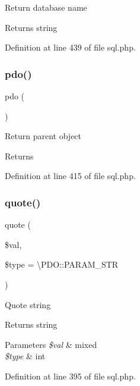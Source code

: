 Return database name \begin{DoxyReturn}{Returns}
string 
\end{DoxyReturn}


Definition at line 439 of file sql.\+php.

\hypertarget{class_d_b_1_1_s_q_l_aa7612909f2506ecd3f2bc4ecbef3fe31}{}\label{class_d_b_1_1_s_q_l_aa7612909f2506ecd3f2bc4ecbef3fe31} 
\subsubsection{\texorpdfstring{pdo()}{pdo()}}
{\footnotesize\ttfamily pdo (\begin{DoxyParamCaption}{ }\end{DoxyParamCaption})}

Return parent object \begin{DoxyReturn}{Returns}

\end{DoxyReturn}


Definition at line 415 of file sql.\+php.

\hypertarget{class_d_b_1_1_s_q_l_a719a37ee06136f9b4a4214632466bfb1}{}\label{class_d_b_1_1_s_q_l_a719a37ee06136f9b4a4214632466bfb1} 
\subsubsection{\texorpdfstring{quote()}{quote()}}
{\footnotesize\ttfamily quote (\begin{DoxyParamCaption}\item[{}]{\$val,  }\item[{}]{\$type = {\ttfamily \textbackslash{}PDO\+:\+:PARAM\+\_\+STR} }\end{DoxyParamCaption})}

Quote string \begin{DoxyReturn}{Returns}
string 
\end{DoxyReturn}

\begin{DoxyParams}{Parameters}
{\em \$val} & mixed \\
\hline
{\em \$type} & int \\
\hline
\end{DoxyParams}


Definition at line 395 of file sql.\+php.

